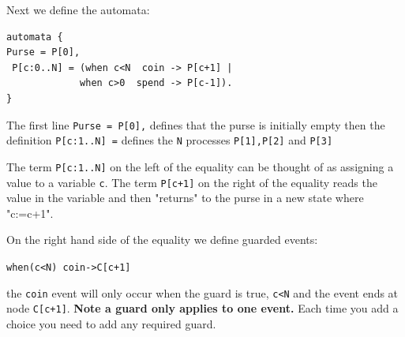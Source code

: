 \documentclass[]{article}
\begin{document}
Next  we define the automata:

\begin{center}\begin{minipage}{0.5\textwidth}
\begin{verbatim}
automata {
Purse = P[0],
 P[c:0..N] = (when c<N  coin -> P[c+1] |
             when c>0  spend -> P[c-1]).
}\end{verbatim} 
\end{minipage}\end{center}

The first line \verb|Purse = P[0],| defines that the purse is initially empty then  the definition \verb$P[c:1..N] =$    defines the \verb$N$ processes \verb$P[1],P[2]$ and \verb$P[3]$ 


The term \verb$P[c:1..N]$ on the left of the equality can be thought of  as assigning a value to a variable \verb$c$. The term \verb$P[c+1]$  on the right of the equality reads the value in the variable and then  "returns" to the purse in a new state where "c:=c+1".  

On the right hand side of the equality we define guarded events:
\begin{center}\verb$when(c<N) coin->C[c+1]$ \end{center}
the \verb$coin$ event  will only occur when the guard is true, \verb|c<N| and the event  ends at node \verb$C[c+1]$.  {\bf Note a guard  only applies to one event.}  Each time you add a choice you need to add any required  guard.
\end{document}
